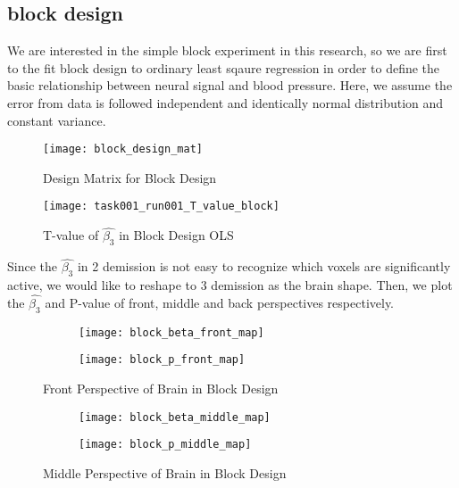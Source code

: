 \subsection{block design}

We are interested in the simple block experiment in this research, so we are 
first to the fit block design to ordinary least sqaure regression in order to
define the basic relationship between neural signal and blood pressure. Here, 
we assume the error from data is followed independent and identically normal
distribution and constant variance.

\begin{figure}[h]
\centering
\texttt{[image: block\_design\_mat]}
\caption{Design Matrix for Block Design}
\end{figure}

\begin{figure}[h]
\centering
\texttt{[image: task001\_run001\_T\_value\_block]}
\caption{T-value of $\hat{\beta_{3}}$ in Block Design OLS}
\end{figure}


Since the $\hat{\beta_{3}}$ in 2 demission is not easy to recognize which voxels
are significantly active, we would like to reshape to 3 demission as the brain 
shape. Then, we plot the $\hat{\beta_{3}}$ and P-value of front, middle and 
back perspectives respectively.

\begin{figure}[h]
\centering
\begin{subfigure}{.45\textwidth}
  \texttt{[image: block\_beta\_front\_map]}
\end{subfigure}%
\begin{subfigure}{.5\textwidth}
  \texttt{[image: block\_p\_front\_map]}
  \centering
\end{subfigure}
\caption{Front Perspective of Brain in Block Design\label{fig:fpBrain}}
\end{figure}

\begin{figure}[h]
\centering
\begin{subfigure}{.45\textwidth}
  \texttt{[image: block\_beta\_middle\_map]}
\end{subfigure}%
\begin{subfigure}{.5\textwidth}
  \texttt{[image: block\_p\_middle\_map]}
  \centering
\end{subfigure}
\caption{Middle Perspective of Brain in Block Design\label{fig:mpBrain}}
\end{figure}

